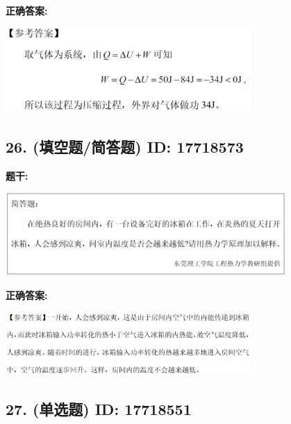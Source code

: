 \documentclass[12pt]{article}
\begin{document}
\textbf{正确答案:}

\begin{center}\includegraphics[width=0.7\textwidth, height=0.2\textheight, keepaspectratio]{question_25_17718572/correct_answer_1_img_1.png}\end{center}

\vspace{0.5em}\hrulefill\vspace{1em}

\subsection*{26. (填空题/简答题) \small ID: 17718573}

\textbf{题干:}


\begin{center}\includegraphics[width=0.8\textwidth, height=0.25\textheight, keepaspectratio]{question_26_17718573/title_img_1.png}\end{center}

\textbf{正确答案:}

\begin{center}\includegraphics[width=0.7\textwidth, height=0.2\textheight, keepaspectratio]{question_26_17718573/correct_answer_1_img_1.png}\end{center}

\vspace{0.5em}\hrulefill\vspace{1em}

\subsection*{27. (单选题) \small ID: 17718551}
\end{document}
